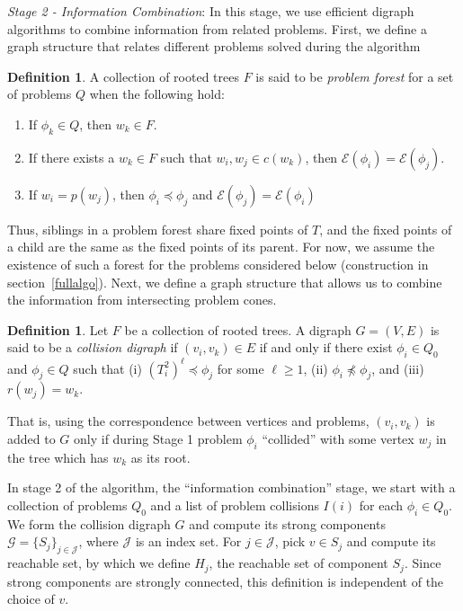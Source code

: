 \documentclass[11pt,reqno]{amsart}
\theoremstyle{definition}
\newtheorem{defn}[thm]{Definition}
\numberwithin{equation}{section}
\newcommand{\pre}{\phi}
\newcommand{\fix}{\mathcal{E}}
\newcommand{\peq}{\preceq}
\newcommand{\strongc}{\mathcal{G}}
\newcommand{\strongcomp}{S}
\newcommand{\acto}{Q_0}
\newcommand{\act}{Q}
\newcommand{\coll}{I}
\newcommand{\reach}{H}
\newcommand{\forest}{F}
\begin{document}
\emph{Stage 2 - Information Combination}: In this stage, we use efficient digraph algorithms to combine information from related problems.
First, we define a graph structure that relates different problems solved during the algorithm
\begin{defn} \label{def:forest}
A collection of rooted trees $\forest$ is said to be \emph{problem forest} for a set of problems $\act$ when the following hold:

\begin{enumerate}
\item If $\pre_k \in Q$, then $w_k \in \forest$. \label{def:forest1}
\item If there exists a $w_k \in F$ such that $w_i, w_j \in c(w_k)$, then $\fix(\pre_i) = \fix(\pre_j)$. \label{def:forest2}
\item If $w_i = p(w_j)$, then $\pre_i \peq \pre_j$ and $\fix(\pre_j) = \fix(\pre_i)$ \label{def:forest3} 
\end{enumerate} 

\end{defn}

Thus, siblings in a problem forest share fixed points of $T$, and the fixed points of a child are the same as the fixed points of its parent. 
For now, we assume the existence of such a forest for the problems considered below (construction in section~\ref{fullalgo}). Next, we define a graph structure that allows us to combine the information from intersecting problem cones.

\begin{defn} \label{def:graph}
Let $\forest$ be a collection of rooted trees. A digraph $G = (V,E)$ is said to be a \emph{collision digraph} if $(v_i,v_k) \in E$ if and only if there exist $\pre_i \in \acto$ and $\pre_j \in \act$ such that (i) $(T_i^2)^{\ell} \peq \pre_j$ for some $\ell \geq 1$, (ii) $\pre_i \not \peq \pre_j$, and (iii) $r(w_j) = w_k$.
\end{defn}

That is, using the correspondence between vertices and problems, $(v_i,v_k)$ is added to $G$ only if during Stage 1 problem $\pre_i$ ``collided'' with some vertex $w_j$ in the tree which has $w_k$ as its root.  

In stage 2 of the algorithm, the ``information combination'' stage, we start with a collection of problems $\acto$ and a list of problem collisions $\coll(i)$ for each $\pre_i \in \acto$.
We form the collision digraph $G$ and compute its strong components $\strongc = \{\strongcomp_j\}_{j\in \mathcal{J}}$, where $\mathcal{J}$ is an index set. 
For $j \in \mathcal{J}$, pick $v \in \strongcomp_j$ and compute its reachable set, by which we define $\reach_j$, the reachable set of component $\strongcomp_j$. 
Since strong components are strongly connected, this definition is independent of the choice of $v$. 
\end{document}
